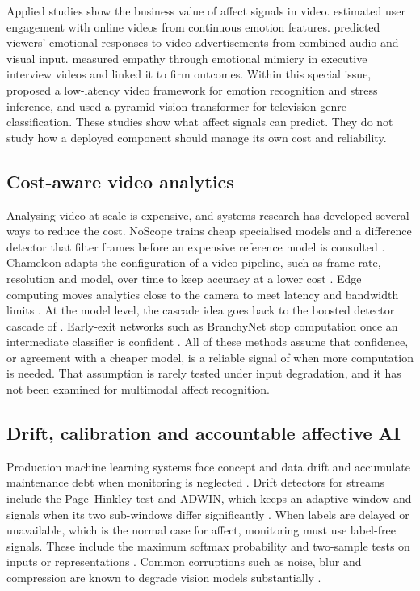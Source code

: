 Applied studies show the business value of affect signals in video. \citet{stappen2022} estimated user engagement with online videos from continuous emotion features. \citet{antonov2024} predicted viewers' emotional responses to video advertisements from combined audio and visual input. \citet{cui2025} measured empathy through emotional mimicry in executive interview videos and linked it to firm outcomes. Within this special issue, \citet{mishra2026} proposed a low-latency video framework for emotion recognition and stress inference, and \citet{alarfaj2026} used a pyramid vision transformer for television genre classification. These studies show what affect signals can predict. They do not study how a deployed component should manage its own cost and reliability.

\subsection{Cost-aware video analytics}

Analysing video at scale is expensive, and systems research has developed several ways to reduce the cost. NoScope trains cheap specialised models and a difference detector that filter frames before an expensive reference model is consulted \citep{kang2017}. Chameleon adapts the configuration of a video pipeline, such as frame rate, resolution and model, over time to keep accuracy at a lower cost \citep{jiang2018}. Edge computing moves analytics close to the camera to meet latency and bandwidth limits \citep{ananthanarayanan2017,gong2025}. At the model level, the cascade idea goes back to the boosted detector cascade of \citet{viola2001}. Early-exit networks such as BranchyNet stop computation once an intermediate classifier is confident \citep{teerapittayanon2016}. All of these methods assume that confidence, or agreement with a cheaper model, is a reliable signal of when more computation is needed. That assumption is rarely tested under input degradation, and it has not been examined for multimodal affect recognition.

\subsection{Drift, calibration and accountable affective AI}

Production machine learning systems face concept and data drift \citep{gama2014,lu2019drift} and accumulate maintenance debt when monitoring is neglected \citep{sculley2015}. Drift detectors for streams include the Page--Hinkley test \citep{page1954} and ADWIN, which keeps an adaptive window and signals when its two sub-windows differ significantly \citep{bifet2007}. When labels are delayed or unavailable, which is the normal case for affect, monitoring must use label-free signals. These include the maximum softmax probability \citep{hendrycks2017} and two-sample tests on inputs or representations \citep{rabanser2019}. Common corruptions such as noise, blur and compression are known to degrade vision models substantially \citep{hendrycks2019}.

